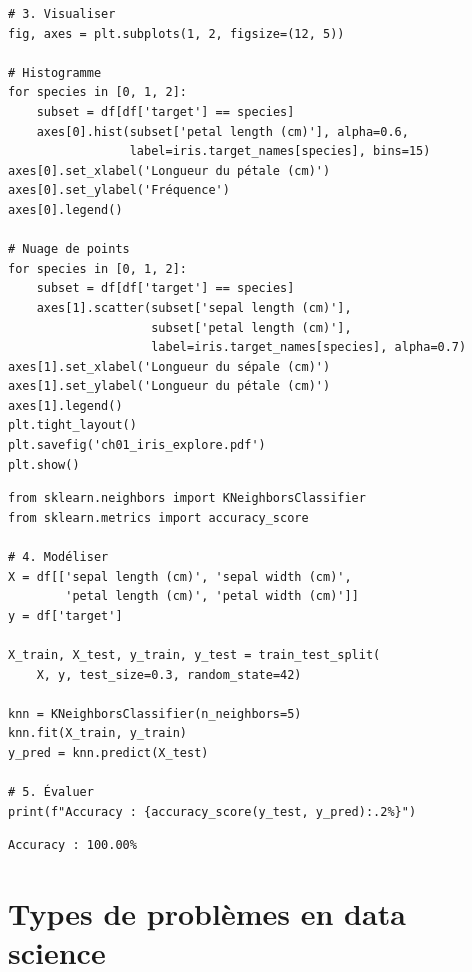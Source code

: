 \begin{codeblock}[title=\textbf{Python --- Visualisation}]
\begin{verbatim}
# 3. Visualiser
fig, axes = plt.subplots(1, 2, figsize=(12, 5))

# Histogramme
for species in [0, 1, 2]:
    subset = df[df['target'] == species]
    axes[0].hist(subset['petal length (cm)'], alpha=0.6,
                 label=iris.target_names[species], bins=15)
axes[0].set_xlabel('Longueur du pétale (cm)')
axes[0].set_ylabel('Fréquence')
axes[0].legend()

# Nuage de points
for species in [0, 1, 2]:
    subset = df[df['target'] == species]
    axes[1].scatter(subset['sepal length (cm)'],
                    subset['petal length (cm)'],
                    label=iris.target_names[species], alpha=0.7)
axes[1].set_xlabel('Longueur du sépale (cm)')
axes[1].set_ylabel('Longueur du pétale (cm)')
axes[1].legend()
plt.tight_layout()
plt.savefig('ch01_iris_explore.pdf')
plt.show()
\end{verbatim}
\end{codeblock}

\begin{codeblock}[title=\textbf{Python --- Mod\'elisation simple}]
\begin{verbatim}
from sklearn.neighbors import KNeighborsClassifier
from sklearn.metrics import accuracy_score

# 4. Modéliser
X = df[['sepal length (cm)', 'sepal width (cm)',
        'petal length (cm)', 'petal width (cm)']]
y = df['target']

X_train, X_test, y_train, y_test = train_test_split(
    X, y, test_size=0.3, random_state=42)

knn = KNeighborsClassifier(n_neighbors=5)
knn.fit(X_train, y_train)
y_pred = knn.predict(X_test)

# 5. Évaluer
print(f"Accuracy : {accuracy_score(y_test, y_pred):.2%}")
\end{verbatim}
\end{codeblock}

\begin{codeoutput}
\begin{verbatim}
Accuracy : 100.00%
\end{verbatim}
\end{codeoutput}

\section{Types de probl\`emes en data science}

